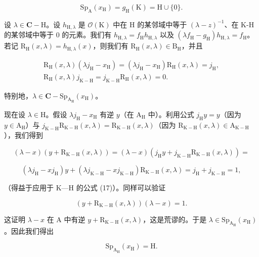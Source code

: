 \[
\mathrm{Sp} _ {\mathrm{A}} (x _ {\mathrm{H}}) = g _ {\mathrm{H}} (\mathrm{K}) = \mathrm{H} \cup \{0 \}.
\]

设 \(\lambda \in \mathbf{C} - \mathrm{H}\)。设 \(h_{\mathrm{H},\lambda}\) 是 \(\mathcal{O}(\mathrm{K})\) 中在 H 的某邻域中等于 \((\lambda - z)^{-1}\)、在 K-H 的某邻域中等于 0 的元素。我们有 \(h_{\mathrm{H},\lambda} = f_{\mathrm{H}}h_{\mathrm{H},\lambda}\) 以及 \((\lambda f_{\mathrm{H}} - g_{\mathrm{H}})h_{\mathrm{H},\lambda} = f_{\mathrm{H}}\)。若记 \(\mathrm{R_H}(x,\lambda) = h_{\mathrm{H},\lambda}(x)\)，则我们有 \(\mathrm{R_H}(x,\lambda) \in \mathrm{B_H}\)，并且

\[
\begin{array}{r} \mathrm {R_ {H}} (x, \lambda) (\lambda j _ {\mathrm{H}} - x _ {\mathrm{H}}) = (\lambda j _ {\mathrm{H}} - x _ {\mathrm{H}}) \mathrm {R_ {H}} (x, \lambda) = j _ {\mathrm{H}}, \\ \mathrm {R_ {H}} (x, \lambda) j _ {\mathrm {K-H}} = j _ {\mathrm {K-H}} \mathrm {R_ {H}} (x, \lambda) = 0. \end{array}\tag{17}
\]

特别地，\(\lambda \in \mathbf{C} - \mathrm{Sp}_{\mathrm{A_H}}(x_\mathrm{H})\)。

现在设 \(\lambda\in\mathrm{H}\)。假设 \(\lambda j_{\mathrm{H}}-x_{\mathrm{H}}\) 有逆 \(y\)（在 \(\mathrm{A}_{\mathrm{H}}\) 中）。利用公式 \(j_{\mathrm{H}}y=y\)（因为 \(y\in\mathrm{A}_{\mathrm{H}}\)）与 \(j_{\mathrm{K-H}}\mathrm{R}_{\mathrm{K-H}}(x,\lambda)=\mathrm{R}_{\mathrm{K-H}}(x,\lambda)\)（因为 \(\mathrm{R}_{\mathrm{K-H}}(x,\lambda)\in\mathrm{A}_{\mathrm{K-H}}\)），我们得到

\[
(\lambda - x) (y + \mathrm{R} _ {\mathrm{K-H}} (x, \lambda)) = (\lambda - x) (j _ {\mathrm{H}} y + j _ {\mathrm{K-H}} \mathrm{R} _ {\mathrm{K-H}} (x, \lambda)) =
\]

\[
(\lambda j _ {\mathrm{H}} - x j _ {\mathrm{H}}) y + (\lambda j _ {\mathrm {K-H}} - x j _ {\mathrm {K-H}}) \mathrm{R} _ {\mathrm {K-H}} (x, \lambda) = j _ {\mathrm{H}} + j _ {\mathrm {K-H}} = 1,
\]

（得益于应用于 K---H 的公式 (17)）。同样可以验证

\[
(y + \mathrm{R} _ {\mathrm{K-H}} (x, \lambda)) (\lambda - x) = 1.
\]

这证明 \(\lambda - x\) 在 A 中有逆 \(y + \mathrm{R}_{\mathrm{K - H}}(x, \lambda)\)，这是荒谬的。于是 \(\lambda \in \mathrm{Sp}_{\mathrm{A_H}}(x_{\mathrm{H}})\)。因此我们得出

\[
\mathrm{Sp} _ {\mathrm{A} _ {\mathrm{H}}} (x _ {\mathrm{H}}) = \mathrm{H}.\tag{18}
\]

